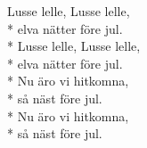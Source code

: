 \begin{SongText}
    \begin{SongVerse}
        Lusse lelle, Lusse lelle,\\*%
        elva nätter före jul.\\*%
        Lusse lelle, Lusse lelle,\\*%
        elva nätter före jul.\\*%
        Nu äro vi hitkomna,\\*%
        så näst före jul.\\*%
        Nu äro vi hitkomna,\\*%
        så näst före jul.
    \end{SongVerse}
\end{SongText}